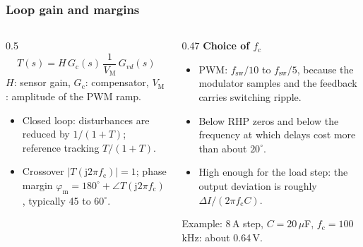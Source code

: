 \begin{frame}
	\frametitle{Loop gain and margins}
	\begin{columns}[T]
		\begin{column}{0.5\textwidth}
			\small
			\begin{equation*}
				T(s)=H\,G_\mathrm{c}(s)\,\frac{1}{V_\mathrm{M}}\,G_{vd}(s)
			\end{equation*}
			$H$: sensor gain, $G_\mathrm{c}$: compensator, $V_\mathrm{M}$: amplitude of the PWM ramp.
			\begin{itemize}
				\item Closed loop: disturbances are reduced by $1/(1+T)$; reference tracking $T/(1+T)$.
				\item Crossover $|T(\mathrm{j}2\pi f_\mathrm{c})|=1$; phase margin $\varphi_\mathrm{m}=180^\circ+\angle T(\mathrm{j}2\pi f_\mathrm{c})$, typically 45 to $60^\circ$.
			\end{itemize}
		\end{column}
		\begin{column}{0.47\textwidth}
			\small
			\textbf{Choice of $f_\mathrm{c}$}
			\begin{itemize}
				\item PWM: $f_\mathrm{sw}/10$ to $f_\mathrm{sw}/5$, because the modulator samples and the feedback carries switching ripple.
				\item Below RHP zeros and below the frequency at which delays cost more than about $20^\circ$.
				\item High enough for the load step: the output deviation is roughly $\Delta I/(2\pi f_\mathrm{c}C)$.
			\end{itemize}
			Example: 8\,A step, $C=20\,\mu$F, $f_\mathrm{c}=100$\,kHz: about 0.64\,V.
		\end{column}
	\end{columns}
\end{frame}

